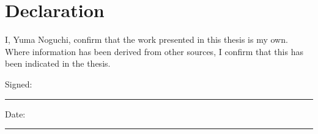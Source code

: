 \chapter*{Declaration}

I, Yuma Noguchi, confirm that the work presented in this thesis is my own. Where information has been derived from other sources, I confirm that this has been indicated in the thesis.

\vspace{2cm}

\noindent
Signed: \rule{5cm}{0.4pt}

\vspace{1cm}

\noindent
Date: \rule{5cm}{0.4pt}

\clearpage
